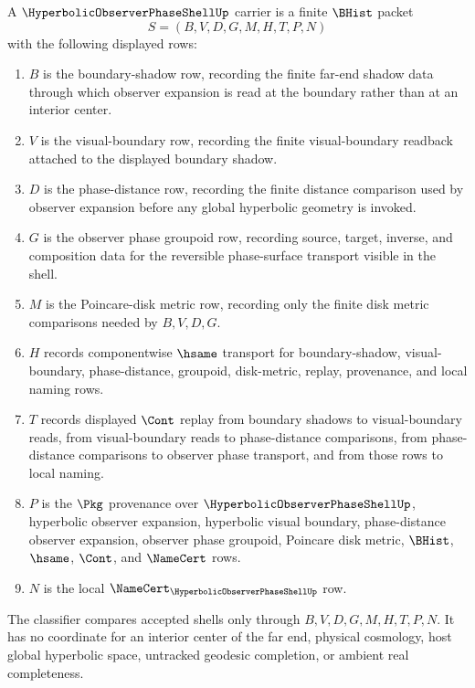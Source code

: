 \begin{definition}
\label{def:hyperbolic-observer-phase-shell-carrier}
A $\HyperbolicObserverPhaseShellUp$ carrier is a finite $\BHist$ packet
$$
S=(B,V,D,G,M,H,T,P,N)
$$
with the following displayed rows:
\begin{enumerate}
\item $B$ is the boundary-shadow row, recording the finite far-end shadow data through which observer expansion is read at the boundary rather than at an interior center.
\item $V$ is the visual-boundary row, recording the finite visual-boundary readback attached to the displayed boundary shadow.
\item $D$ is the phase-distance row, recording the finite distance comparison used by observer expansion before any global hyperbolic geometry is invoked.
\item $G$ is the observer phase groupoid row, recording source, target, inverse, and composition data for the reversible phase-surface transport visible in the shell.
\item $M$ is the Poincare-disk metric row, recording only the finite disk metric comparisons needed by $B,V,D,G$.
\item $H$ records componentwise $\hsame$ transport for boundary-shadow, visual-boundary, phase-distance, groupoid, disk-metric, replay, provenance, and local naming rows.
\item $T$ records displayed $\Cont$ replay from boundary shadows to visual-boundary reads, from visual-boundary reads to phase-distance comparisons, from phase-distance comparisons to observer phase transport, and from those rows to local naming.
\item $P$ is the $\Pkg$ provenance over $\HyperbolicObserverPhaseShellUp$, hyperbolic observer expansion, hyperbolic visual boundary, phase-distance observer expansion, observer phase groupoid, Poincare disk metric, $\BHist$, $\hsame$, $\Cont$, and $\NameCert$ rows.
\item $N$ is the local $\NameCert_{\HyperbolicObserverPhaseShellUp}$ row.
\end{enumerate}
The classifier compares accepted shells only through $B,V,D,G,M,H,T,P,N$. It has no coordinate for an interior center of the far end, physical cosmology, host global hyperbolic space, untracked geodesic completion, or ambient real completeness.
\end{definition}

